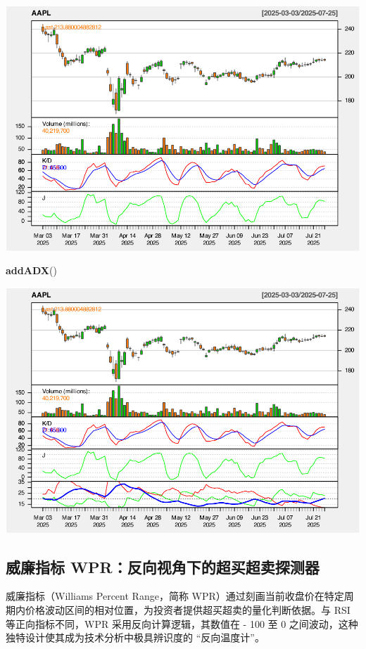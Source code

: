 \documentclass[]{ctexbook}
\newenvironment{Shaded}{\begin{snugshade}}{\end{snugshade}}
\newcommand{\FunctionTok}[1]{\textcolor[rgb]{0.13,0.29,0.53}{\textbf{#1}}}
\newcommand{\NormalTok}[1]{#1}
\begin{document}
\includegraphics[width=0.9\linewidth]{QuantmodHandbook_files/figure-latex/kdj_2-4}

\begin{Shaded}
\begin{Highlighting}[]
\FunctionTok{addADX}\NormalTok{()}
\end{Highlighting}
\end{Shaded}

\includegraphics[width=0.9\linewidth]{QuantmodHandbook_files/figure-latex/kdj_2-5}

\subsection{威廉指标 WPR：反向视角下的超买超卖探测器}\label{ux5a01ux5ec9ux6307ux6807-wprux53cdux5411ux89c6ux89d2ux4e0bux7684ux8d85ux4e70ux8d85ux5356ux63a2ux6d4bux5668}

威廉指标（Williams Percent Range，简称 WPR）通过刻画当前收盘价在特定周期内价格波动区间的相对位置，为投资者提供超买超卖的量化判断依据。与 RSI 等正向指标不同，WPR 采用反向计算逻辑，其数值在 - 100 至 0 之间波动，这种独特设计使其成为技术分析中极具辨识度的 ``反向温度计''。
\end{document}
